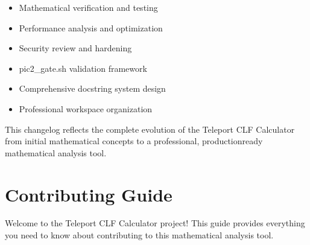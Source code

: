 \documentclass[letterpaper,10pt,english]{sphinxmanual}
\begin{document}
\sphinxAtStartPar
{}
\begin{itemize}
\item {} 
\sphinxAtStartPar
Mathematical verification and testing

\item {} 
\sphinxAtStartPar
Performance analysis and optimization

\item {} 
\sphinxAtStartPar
Security review and hardening

\end{itemize}

\sphinxAtStartPar
{}
\begin{itemize}
\item {} 
\sphinxAtStartPar
pic2\_gate.sh validation framework

\item {} 
\sphinxAtStartPar
Comprehensive docstring system design

\item {} 
\sphinxAtStartPar
Professional workspace organization

\end{itemize}

\sphinxAtStartPar
This changelog reflects the complete evolution of the Teleport CLF Calculator from initial mathematical concepts to a professional, production\sphinxhyphen{}ready mathematical analysis tool.

\sphinxstepscope


\section{Contributing Guide}
\label{\detokenize{contributing:contributing-guide}}\label{\detokenize{contributing::doc}}
\sphinxAtStartPar
Welcome to the Teleport CLF Calculator project! This guide provides everything you need to know about contributing to this mathematical analysis tool.
\end{document}
